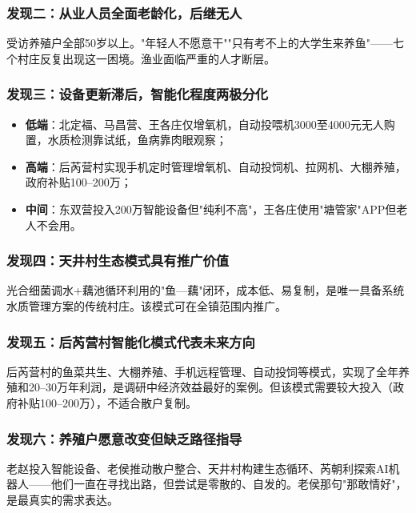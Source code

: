 \documentclass[12pt,a4paper]{article}
\begin{document}
\subsubsection{发现二：从业人员全面老龄化，后继无人}

受访养殖户全部50岁以上。"年轻人不愿意干""只有考不上的大学生来养鱼"——七个村庄反复出现这一困境。渔业面临严重的人才断层。

\subsubsection{发现三：设备更新滞后，智能化程度两极分化}

\begin{itemize}[leftmargin=2em]
    \item \textbf{低端}：北定福、马昌营、王各庄仅增氧机，自动投喂机3000至4000元无人购置，水质检测靠试纸，鱼病靠肉眼观察；
    \item \textbf{高端}：后芮营村实现手机定时管理增氧机、自动投饲机、拉网机、大棚养殖，政府补贴100--200万；
    \item \textbf{中间}：东双营投入200万智能设备但"纯利不高"，王各庄使用"塘管家"APP但老人不会用。
\end{itemize}

\subsubsection{发现四：天井村生态模式具有推广价值}

光合细菌调水+藕池循环利用的"鱼---藕"闭环，成本低、易复制，是唯一具备系统水质管理方案的传统村庄。该模式可在全镇范围内推广。

\subsubsection{发现五：后芮营村智能化模式代表未来方向}

后芮营村的鱼菜共生、大棚养殖、手机远程管理、自动投饲等模式，实现了全年养殖和20--30万年利润，是调研中经济效益最好的案例。但该模式需要较大投入（政府补贴100--200万），不适合散户复制。

\subsubsection{发现六：养殖户愿意改变但缺乏路径指导}

老赵投入智能设备、老侯推动散户整合、天井村构建生态循环、芮朝利探索AI机器人——他们一直在寻找出路，但尝试是零散的、自发的。老侯那句"那敢情好"，是最真实的需求表达。
\end{document}
